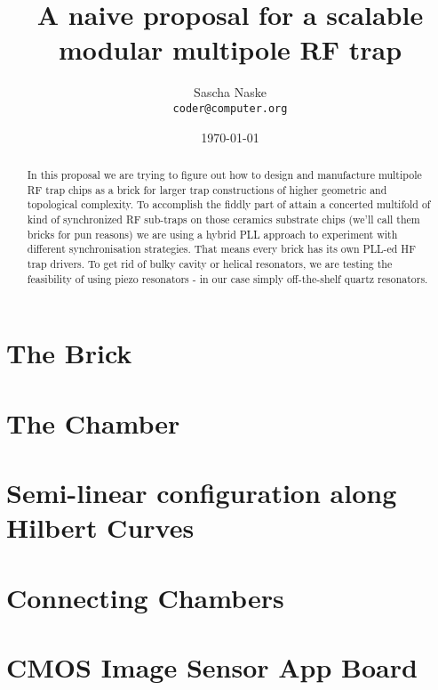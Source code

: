 \documentclass[11pt, a4paper]{scrartcl}
\begin{document}
\titlehead{\centering\texttt{[image: 77K\_fin]}}
\title{ A naive proposal for a scalable modular multipole RF trap }

\author{Sascha Naske\\
        \texttt{coder@computer.org}}
\date{\today}
\maketitle

\begin{abstract}
In this proposal we are trying to figure out how to design and manufacture multipole RF trap chips as a brick for larger trap constructions of higher geometric and topological complexity.
To accomplish the fiddly part of attain a concerted multifold of kind of synchronized RF sub-traps on those ceramics substrate chips (we'll call them bricks for pun reasons) we are using a hybrid PLL approach to experiment with different synchronisation strategies.
That means every brick has its own PLL-ed HF trap drivers. To get rid of bulky cavity or helical resonators, we are testing the feasibility of using piezo resonators - in our case simply off-the-shelf quartz resonators.
\end{abstract}
\section{The Brick}
\section{The Chamber}
\section{Semi-linear configuration along Hilbert Curves}
\section{Connecting Chambers}
\section{CMOS Image Sensor App Board}
\end{document}
